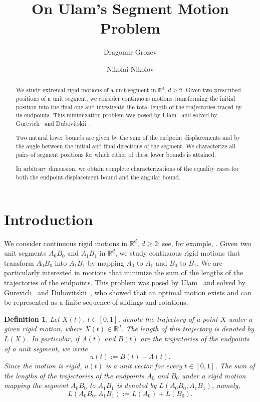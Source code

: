 \documentclass[a4paper,12pt,reqno]{amsart}
\title{On Ulam's Segment Motion Problem}
\author{Dragomir Grozev}
\author{Nikolai Nikolov}
\newtheorem*{definition}{Definition}
\begin{document}

\begin{abstract}

We study extremal rigid motions of a unit segment in $\mathbb{R}^d$, $d\ge 2$. Given two prescribed positions of a unit segment, we consider continuous motions transforming the initial position into the final one and investigate the total length of the trajectories traced by its endpoints. This minimization problem was posed by Ulam~\cite{Ulam1960} and solved by Gurevich~\cite{Gurevich1977} and Dubovitskii~\cite{Dubovitskii1976}.

Two natural lower bounds are given by the sum of the endpoint displacements and by the angle between the initial and final directions of the segment. We characterize all pairs of segment positions for which either of these lower bounds is attained.

In arbitrary dimension, we obtain complete characterizations of the equality cases for both the endpoint-displacement bound and the angular bound.
\end{abstract}

\maketitle

\vspace{-8mm}


\section{Introduction}

We consider continuous rigid motions in \(\mathbb{R}^d\), \(d\ge 2\); see, for example, \cite{Bo_Roth_1990}. Given two unit segments \(A_0B_0\) and \(A_1B_1\) in \(\mathbb{R}^d\), we study continuous rigid motions that transform \(A_0B_0\) into \(A_1B_1\) by mapping \(A_0\) to \(A_1\) and \(B_0\) to \(B_1\). We are particularly interested in motions that minimize the sum of the lengths of the trajectories of the endpoints. This problem was posed by Ulam~\cite{Ulam1960} and solved by Gurevich~\cite{Gurevich1977} and Dubovitskii~\cite{Dubovitskii1976}, who showed that an optimal motion exists and can be represented as a finite sequence of slidings and rotations.

\begin{definition}
Let \(X(t)\), \(t\in[0,1]\), denote the trajectory of a point \(X\) under a given rigid motion, where \(X(t)\in\mathbb{R}^d\). The length of this trajectory is denoted by \(L(X)\). In particular, if \(A(t)\) and \(B(t)\) are the trajectories of the endpoints of a unit segment, we write
\[
u(t):=B(t)-A(t).
\]
Since the motion is rigid, \(u(t)\) is a unit vector for every \(t\in[0,1]\). The sum of the lengths of the trajectories of the endpoints \(A_0\) and \(B_0\) under a rigid motion mapping the segment \(A_0B_0\) to \(A_1B_1\) is denoted by \(L(A_0B_0,A_1B_1)\), namely,
\[
L(A_0B_0,A_1B_1):=L(A_0)+L(B_0).
\]
\end{definition}
\end{document}
